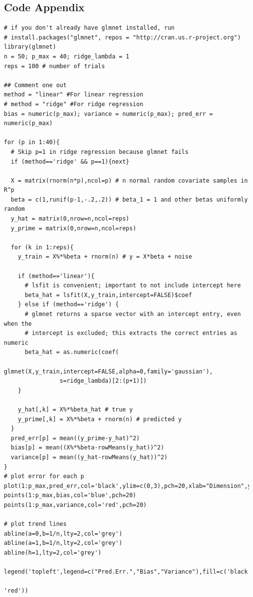 \documentclass[12pt]{article}
\begin{document}
\newpage
\subsection{Code Appendix}
\label{sec:code}

\begin{verbatim}
# if you don't already have glmnet installed, run
# install.packages("glmnet", repos = "http://cran.us.r-project.org")
library(glmnet)
n = 50; p_max = 40; ridge_lambda = 1
reps = 100 # number of trials

## Comment one out
method = "linear" #For linear regression
# method = "ridge" #For ridge regression
bias = numeric(p_max); variance = numeric(p_max); pred_err = numeric(p_max)

for (p in 1:40){
  # Skip p=1 in ridge regression because glmnet fails
  if (method=='ridge' && p==1){next}

  X = matrix(rnorm(n*p),ncol=p) # n normal random covariate samples in R^p
  beta = c(1,runif(p-1,-.2,.2)) # beta_1 = 1 and other betas uniformly random
  y_hat = matrix(0,nrow=n,ncol=reps)
  y_prime = matrix(0,nrow=n,ncol=reps)

  for (k in 1:reps){
    y_train = X%*%beta + rnorm(n) # y = X*beta + noise

    if (method=='linear'){
      # lsfit is convenient; important to not include intercept here
      beta_hat = lsfit(X,y_train,intercept=FALSE)$coef
    } else if (method=='ridge') {
      # glmnet returns a sparse vector with an intercept entry, even when the
      # intercept is excluded; this extracts the correct entries as numeric
      beta_hat = as.numeric(coef(
                    glmnet(X,y_train,intercept=FALSE,alpha=0,family='gaussian'),
                s=ridge_lambda)[2:(p+1)])
    }

    y_hat[,k] = X%*%beta_hat # true y
    y_prime[,k] = X%*%beta + rnorm(n) # predicted y
  }
  pred_err[p] = mean((y_prime-y_hat)^2)
  bias[p] = mean((X%*%beta-rowMeans(y_hat))^2)
  variance[p] = mean((y_hat-rowMeans(y_hat))^2)
}
# plot error for each p
plot(1:p_max,pred_err,col='black',ylim=c(0,3),pch=20,xlab="Dimension",ylab="")
points(1:p_max,bias,col='blue',pch=20)
points(1:p_max,variance,col='red',pch=20)

# plot trend lines
abline(a=0,b=1/n,lty=2,col='grey')
abline(a=1,b=1/n,lty=2,col='grey')
abline(h=1,lty=2,col='grey')

legend('topleft',legend=c("Pred.Err.","Bias","Variance"),fill=c('black','blue',
                                                                        'red'))
\end{verbatim}

%
%
\end{document}
